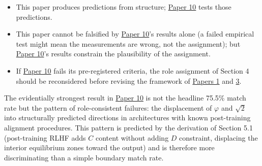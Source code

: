 \documentclass[12pt]{article}
\providecommand{\tightlist}{%
  \setlength{\itemsep}{0pt}\setlength{\parskip}{0pt}}
\begin{document}
\begin{itemize}
\tightlist
\item
  This paper produces predictions from structure;
  \href{https://github.com/baardev/truevalue/blob/main/docnav/Research/papers/10_tholonic-neural-architecture/10_tholonic-neural-architecture.pdf}{Paper
  10} tests those predictions.
\item
  This paper cannot be falsified by
  \href{https://github.com/baardev/truevalue/blob/main/docnav/Research/papers/10_tholonic-neural-architecture/10_tholonic-neural-architecture.pdf}{Paper
  10}'s results alone (a failed empirical test might mean the
  measurements are wrong, not the assignment); but
  \href{https://github.com/baardev/truevalue/blob/main/docnav/Research/papers/10_tholonic-neural-architecture/10_tholonic-neural-architecture.pdf}{Paper
  10}'s results constrain the plausibility of the assignment.
\item
  If
  \href{https://github.com/baardev/truevalue/blob/main/docnav/Research/papers/10_tholonic-neural-architecture/10_tholonic-neural-architecture.pdf}{Paper
  10} fails its pre-registered criteria, the role assignment of Section
  4 should be reconsidered before revising the framework of
  \href{https://github.com/baardev/truevalue/blob/main/docnav/Research/papers/1_recursive-tholonic-five-constants/1_recursive-tholonic-five-constants.pdf}{Papers
  1} and
  \href{https://github.com/baardev/truevalue/blob/main/docnav/Research/papers/3_minimal-recursive-triadic-framework/3_minimal-recursive-triadic-framework.pdf}{3}.
\end{itemize}

The evidentially strongest result in
\href{https://github.com/baardev/truevalue/blob/main/docnav/Research/papers/10_tholonic-neural-architecture/10_tholonic-neural-architecture.pdf}{Paper
10} is not the headline 75.5\% match rate but the pattern of
role-consistent failures: the displacement of \(\varphi\) and
\(\sqrt{2}\) into structurally predicted directions in architectures
with known post-training alignment procedures. This pattern is predicted
by the derivation of Section 5.1 (post-training RLHF adds \(C\) content
without adding \(D\) constraint, displacing the interior equilibrium
zones toward the output) and is therefore more discriminating than a
simple boundary match rate.
\end{document}
